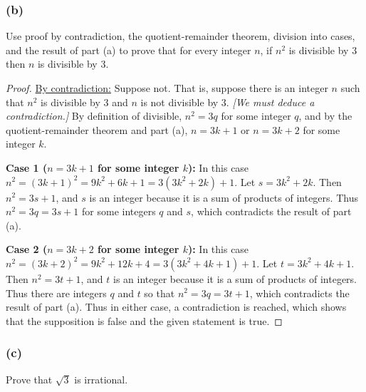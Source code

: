 \documentclass[14pt]{extarticle}
\begin{document}
\subsubsection{(b)}
Use proof by contradiction, the quotient-remainder theorem, division into cases, and the result of part (a) to prove that for every integer $n$, if $n^2$ is divisible by 3 then $n$ is divisible by 3.

\begin{proof}
    \underline{By contradiction:} Suppose not. That is, suppose there is an integer $n$ such that $n^2$ is divisible by 3 and $n$ is not divisible by 3. {\it [We must deduce a contradiction.]} By definition of divisible, $n^2 = 3q$ for some integer $q$, and by the quotient-remainder theorem and part (a), $n = 3k + 1$ or $n = 3k + 2$ for some integer $k$.

        {\bf Case 1 ($n = 3k + 1$ for some integer $k$):} In this case $n^2 = (3k + 1)^2 = 9k^2 + 6k + 1 = 3(3k^2 + 2k) + 1$. Let $s = 3k^2 + 2k$. Then $n^2 = 3s + 1$, and $s$ is an integer because it is a sum of products of integers. Thus $n^2 = 3q = 3s + 1$ for some integers $q$ and $s$, which contradicts the result of part (a).

        {\bf Case 2 ($n = 3k + 2$ for some integer $k$):} In this case $n^2 = (3k + 2)^2 = 9k^2 + 12k + 4 = 3(3k^2 + 4k + 1) + 1$. Let $t = 3k^2 + 4k + 1$. Then $n^2 = 3t + 1$, and $t$ is an integer because it is a sum of products of integers. Thus there are integers $q$ and $t$ so that $n^2 = 3q = 3t + 1$, which contradicts the result of part (a). Thus in either case, a contradiction is reached, which shows that the supposition is false and the given statement is true.
\end{proof}

\subsubsection{(c)}
Prove that $\sqrt{3}$ is irrational.
\end{document}
